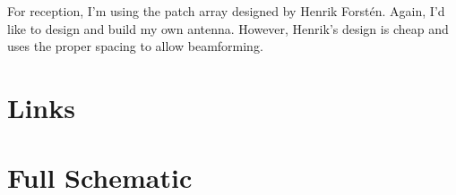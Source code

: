 \documentclass{default}
\newcounter{includepdfpage}
\begin{document}
For reception, I'm using the patch array designed by Henrik Forst\'en. Again, I'd like to design and
build my own antenna. However, Henrik's design is cheap and uses the proper spacing to allow
beamforming.





\begin{appendices}

        

        \chapter{Links}
        \label{cha:links}


        \chapter{Full Schematic}
        \label{cha:schematic}

        

\end{appendices}
\end{document}
